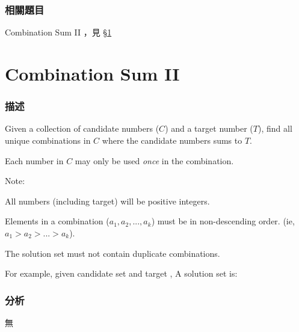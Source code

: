 \subsubsection{相關題目}
\begindot
\item Combination Sum II ，見 \S \ref{sec:combination-sum-ii}
\myenddot


\section{Combination Sum II} %
\label{sec:combination-sum-ii}


\subsubsection{描述}
Given a collection of candidate numbers ($C$) and a target number ($T$), find all unique combinations in $C$ where the candidate numbers sums to $T$.

Each number in $C$ may only be used \emph{once} in the combination.

Note:
\begindot
\item All numbers (including target) will be positive integers.
\item Elements in a combination ($a_1, a_2, ..., a_k$) must be in non-descending order. (ie, $a_1 > a_2 > ... > a_k$).
\item The solution set must not contain duplicate combinations.
\myenddot

For example, given candidate set  and target , 
A solution set is: 
\begin{Code}
[1, 7] 
[1, 2, 5] 
[2, 6] 
[1, 1, 6]
\end{Code}


\subsubsection{分析}
無


